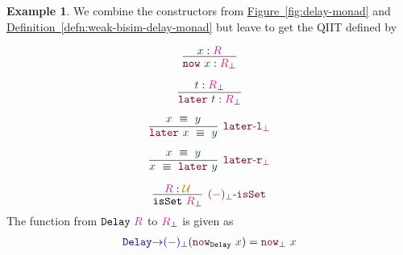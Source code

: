 \documentclass[twoside,11pt,openright]{report}
\theoremstyle{plain} %
\theoremstyle{definition}
\newtheorem{exmp}{Example} %
\theoremstyle{remark}
\newcommand*{\defref}[1]{\hyperref[defn:#1]{Definition~\ref*{defn:#1}}}
\newcommand*{\figref}[1]{\hyperref[fig:#1]{Figure~\ref*{fig:#1}}}
\newcommand*{\term}[1]{\textcolor{green!30!black}{#1}} %
\newcommand*{\type}[1]{\textcolor{magenta!90!black}{#1}}
\newcommand*{\universe}[1]{\textcolor{orange!80!black}{#1}}
\newcommand*{\function}[1]{\textcolor{blue!60!black}{\ensuremath{\mathtt{#1}}}}
\newcommand*{\constructor}[1]{\textcolor{purple!60!black}{\ensuremath{\mathtt{#1}}}}
\newcommand*{\typeformer}[1]{\ensuremath{\mathtt{#1}}}
\begin{document}
\begin{exmp}
  We combine the constructors from \figref{delay-monad} and \defref{weak-bisim-delay-monad} but leave to get the QIIT defined by
  \begin{center}
    \strut
    \hfill
    \begin{minipage}[h]{0.35\linewidth}
      \begin{equation}
        \vcenter{\infer{\constructor{now}~\term{x} : \type{R}_{\bot}}{\term{x} : \type{R}}}
      \end{equation}
    \end{minipage}
    \hfill
    \begin{minipage}[h]{0.35\linewidth}
      \begin{equation}
        \vcenter{\infer{\constructor{later}~\term{t} : \type{R}_{\bot}}{\term{t} : \type{R}_{\bot}}}
      \end{equation}
    \end{minipage}
    \hfill
    \strut
  \end{center}
  \begin{center}
    \strut
    \hfill
    \begin{minipage}[h]{0.35\linewidth}
      \begin{equation}
        \vcenter{\infer[\constructor{later\text{-}l_{\bot}}]{\constructor{later}~\term{x}~\equiv~\term{y}}{\term{x}~\equiv~\term{y}}}
      \end{equation}
    \end{minipage}
    \hfill
    \begin{minipage}[h]{0.35\linewidth}
      \begin{equation}
        \vcenter{\infer[\constructor{later\text{-}r_{\bot}}]{\term{x}~\equiv~\constructor{later}~\term{y}}{\term{x}~\equiv~\term{y}}}
      \end{equation}
    \end{minipage}
    \hfill
    \strut
  \end{center}
  \begin{equation}
    \vcenter{\infer[\constructor{(-)_{\bot}\text{-}isSet}]{\mathtt{isSet}~\type{R}_{\bot}}{\type{R} : \universe{\mathcal{U}}}}
  \end{equation}
  The function from \(\typeformer{Delay}~\type{R}\) to \(\type{R}_{\bot}\) is given as
  \begin{equation}
    \begin{aligned}
      &\function{Delay{\rightarrow}(-)_{\bot}} (\constructor{now}_{\typeformer{Delay}}~\term{x}) = \constructor{now}_{\bot}~\term{x} \\

\end{aligned}
\end{equation}
\end{exmp}
\end{document}
